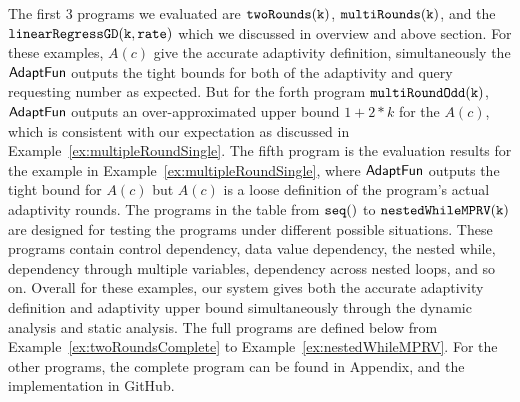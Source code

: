 The first 3 programs we evaluated are $\mathtt{twoRounds(k)}$, $ \mathtt{multiRounds(k)}$, 
and the $\mathtt{linearRegressGD(k, rate)}$ which we discussed in overview and above section.
For these examples, $A(c)$ 
give the accurate adaptivity definition, 
simultaneously the $\textsf{AdaptFun}$ outputs the tight bounds for both of the adaptivity and query requesting number as expected.
But for the forth program $\mathtt{multiRoundOdd(k)}$, $\textsf{AdaptFun}$ outputs an over-approximated upper bound $1 + 2*k$ for the $A(c)$, 
which is consistent with our expectation as discussed in Example~\ref{ex:multipleRoundSingle}. 
The fifth program is the evaluation results for the example in Example~\ref{ex:multipleRoundSingle}, where $\textsf{AdaptFun}$ outputs
the tight bound for $A(c)$ but $A(c)$ is a loose definition of the program's actual adaptivity rounds.
%
The programs in the table from  $\mathtt{seq()}$ to $ \mathtt{nestedWhileMPRV(k)}$ are 
designed for testing the programs under different possible situations.
These programs contain control dependency, data value dependency,
the nested while, dependency through multiple variables, dependency across nested loops, and so on. 
Overall for these examples, our system gives both the accurate adaptivity definition and 
adaptivity upper bound simultaneously through the dynamic analysis and 
static analysis.
The full programs are defined below from Example~\ref{ex:twoRoundsComplete} to Example~\ref{ex:nestedWhileMPRV}.
%
For the other programs, the complete program can be found in Appendix, and the implementation in GitHub.
